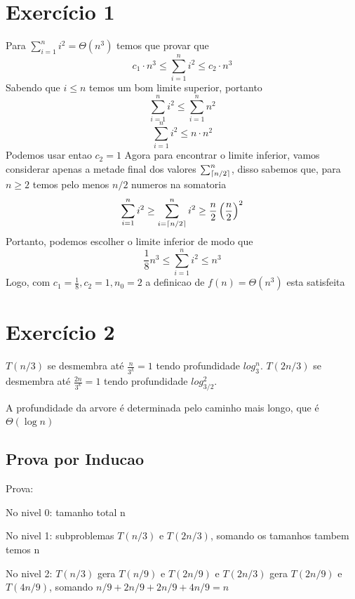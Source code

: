 \documentclass[a4paper,12pt]{article}
\DeclarePairedDelimiter\ceil{\lceil}{\rceil}
\begin{document}
\section*{Exercício 1}
Para $\sum_{i=1}^{n} i^2 = \Theta(n^3)$ temos que provar que 
\begin{equation}
    c_1 \cdot n^3 \le \sum_{i=1}^{n} i^2 \le c_2 \cdot n^3
\end{equation}
Sabendo que $i \le n$ temos um bom limite superior, portanto
\begin{equation}
    \sum_{i=1}^{n} i^2 \le \sum_{i=1}^n n^2
\end{equation}
\begin{equation}
    \sum_{i=1}^{n} i^2 \le n \cdot n^2
\end{equation}
Podemos usar entao $c_2 = 1$
Agora para encontrar o limite inferior, vamos considerar apenas a metade final dos valores $\sum_{\ceil{n/2}}^{n}$, disso sabemos que, para $n \ge 2$ temos pelo menos $n/2$ numeros na somatoria
\begin{equation}
    \sum_{i=1}^{n} i^2 \ge \sum_{i=\ceil{n/2}}^{n} i^2 \ge \frac{n}{2}\left(\frac{n}{2}\right)^2
\end{equation}
Portanto, podemos escolher o limite inferior de modo que
\begin{equation}
    \frac{1}{8}n^3 \le \sum_{i=1}^{n} i^2 \le n^3
\end{equation}
Logo, com $c_1 = \frac{1}{8}, c_2 = 1, n_0 = 2$ a definicao de $f(n) = \Theta(n^3)$ esta satisfeita


\newpage
\section*{Exercício 2}
$T(n/3)$ se desmembra até $\frac{n}{3^k} = 1$ tendo profundidade $log_3^n$.
$T(2n/3)$ se desmembra até $\frac{2n}{3^k} = 1$ tendo profundidade $log_{3/2}^2$.

A profundidade da arvore é determinada pelo caminho mais longo, que é $\Theta(\log{n})$

\subsection*{Prova por Inducao}
Prova:

No nivel 0: tamanho total n

No nivel 1: subproblemas $T(n/3)$ e $T(2n/3)$, somando os tamanhos tambem temos n

No nivel 2: $T(n/3)$ gera $T(n/9)$ e $T(2n/9)$ e $T(2n/3)$ gera $T(2n/9)$ e $T(4n/9)$, somando $n/9 + 2n/9 + 2n/9 + 4n/9 = n$
\end{document}
